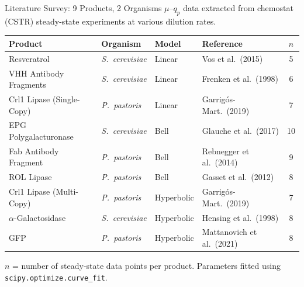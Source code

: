 \documentclass[aspectratio=169, 11pt]{beamer}
\begin{document}
\begin{frame}{Literature Survey: 9 Products, 2 Organisms}
  \vspace{-0.1cm}
  {\small $\mu$--$q_p$ data extracted from chemostat (CSTR) steady-state experiments at various dilution rates.}

  \vspace{0.2cm}
  \begin{center}
  \renewcommand{\arraystretch}{1.15}
  {\footnotesize
  \begin{tabular}{llllc}
    \toprule
    \textbf{Product} & \textbf{Organism} & \textbf{Model} & \textbf{Reference} & \textbf{$n$} \\
    \midrule
    Resveratrol              & \textit{S.\ cerevisiae} & Linear     & Vos et al.\ (2015)              & 5 \\
    VHH Antibody Fragments   & \textit{S.\ cerevisiae} & Linear     & Frenken et al.\ (1998)          & 6 \\
    Crl1 Lipase (Single-Copy) & \textit{P.\ pastoris}  & Linear     & Garrig\'{o}s-Mart.\ (2019)      & 7 \\
    \midrule
    EPG Polygalacturonase    & \textit{S.\ cerevisiae} & Bell       & Glauche et al.\ (2017)          & 10 \\
    Fab Antibody Fragment    & \textit{P.\ pastoris}   & Bell       & Rebnegger et al.\ (2014)        & 9 \\
    ROL Lipase               & \textit{P.\ pastoris}   & Bell       & Gasset et al.\ (2012)           & 8 \\
    \midrule
    Crl1 Lipase (Multi-Copy)  & \textit{P.\ pastoris}  & Hyperbolic & Garrig\'{o}s-Mart.\ (2019)      & 7 \\
    $\alpha$-Galactosidase    & \textit{S.\ cerevisiae} & Hyperbolic & Hensing et al.\ (1998)          & 8 \\
    GFP                      & \textit{P.\ pastoris}   & Hyperbolic & Mattanovich et al.\ (2021)      & 8 \\
    \bottomrule
  \end{tabular}
  }
  \end{center}

  \vspace{0.1cm}
  {\small $n$ = number of steady-state data points per product. Parameters fitted using \texttt{scipy.optimize.curve\_fit}.}
\end{frame}
\end{document}

